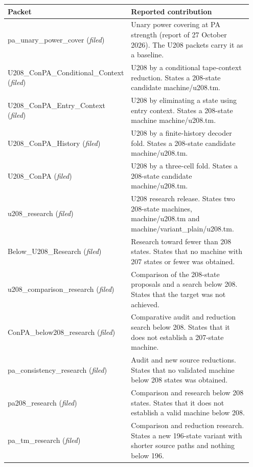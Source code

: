 \begin{longtable}{@{}p{0.33\linewidth}p{0.62\linewidth}@{}}
\toprule Packet & Reported contribution \\ \midrule\endhead
pa\_\allowbreak{}unary\_\allowbreak{}power\_\allowbreak{}cover (\emph{filed}) & Unary power covering at PA strength (report of 27 October 2026). The U208 packets carry it as a baseline. \\
U208\_\allowbreak{}ConPA\_\allowbreak{}Conditional\_\allowbreak{}Context (\emph{filed}) & U208 by a conditional tape-context reduction. States a 208-state candidate machine/u208.tm. \\
U208\_\allowbreak{}ConPA\_\allowbreak{}Entry\_\allowbreak{}Context (\emph{filed}) & U208 by eliminating a state using entry context. States a 208-state machine machine/u208.tm. \\
U208\_\allowbreak{}ConPA\_\allowbreak{}History (\emph{filed}) & U208 by a finite-history decoder fold. States a 208-state candidate machine/u208.tm. \\
U208\_\allowbreak{}ConPA (\emph{filed}) & U208 by a three-cell fold. States a 208-state candidate machine/u208.tm. \\
u208\_\allowbreak{}research (\emph{filed}) & U208 research release. States two 208-state machines, machine/u208.tm and machine/variant\_plain/u208.tm. \\
Below\_\allowbreak{}U208\_\allowbreak{}Research (\emph{filed}) & Research toward fewer than 208 states. States that no machine with 207 states or fewer was obtained. \\
u208\_\allowbreak{}comparison\_\allowbreak{}research (\emph{filed}) & Comparison of the 208-state proposals and a search below 208. States that the target was not achieved. \\
ConPA\_\allowbreak{}below208\_\allowbreak{}research (\emph{filed}) & Comparative audit and reduction search below 208. States that it does not establish a 207-state machine. \\
pa\_\allowbreak{}consistency\_\allowbreak{}research (\emph{filed}) & Audit and new source reductions. States that no validated machine below 208 states was obtained. \\
pa208\_\allowbreak{}research (\emph{filed}) & Comparison and research below 208 states. States that it does not establish a valid machine below 208. \\
pa\_\allowbreak{}tm\_\allowbreak{}research (\emph{filed}) & Comparison and reduction research. States a new 196-state variant with shorter source paths and nothing below 196. \\

\end{longtable}

